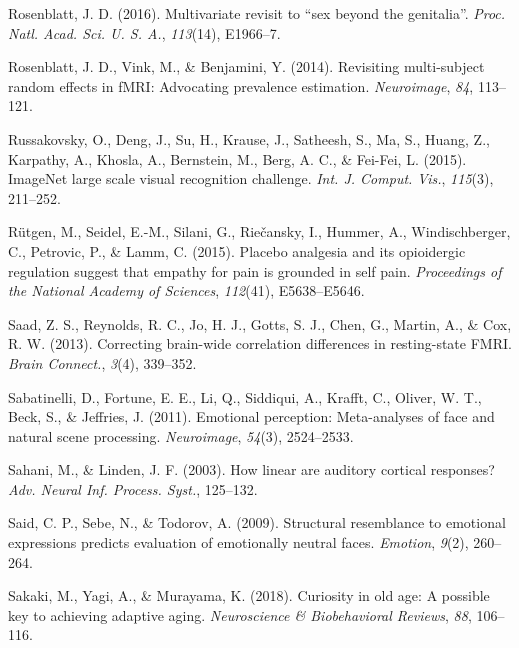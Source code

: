 \documentclass[11pt,american,]{memoir} %
\begin{document}
\leavevmode\hypertarget{ref-Rosenblatt2016-oy}{}%
Rosenblatt, J. D. (2016). Multivariate revisit to ``sex beyond the genitalia''. \emph{Proc. Natl. Acad. Sci. U. S. A.}, \emph{113}(14), E1966--7.

\leavevmode\hypertarget{ref-Rosenblatt2014-az}{}%
Rosenblatt, J. D., Vink, M., \& Benjamini, Y. (2014). Revisiting multi-subject random effects in fMRI: Advocating prevalence estimation. \emph{Neuroimage}, \emph{84}, 113--121.

\leavevmode\hypertarget{ref-Russakovsky2015-oo}{}%
Russakovsky, O., Deng, J., Su, H., Krause, J., Satheesh, S., Ma, S., Huang, Z., Karpathy, A., Khosla, A., Bernstein, M., Berg, A. C., \& Fei-Fei, L. (2015). ImageNet large scale visual recognition challenge. \emph{Int. J. Comput. Vis.}, \emph{115}(3), 211--252.

\leavevmode\hypertarget{ref-rutgen2015placebo}{}%
Rütgen, M., Seidel, E.-M., Silani, G., Riečansky, I., Hummer, A., Windischberger, C., Petrovic, P., \& Lamm, C. (2015). Placebo analgesia and its opioidergic regulation suggest that empathy for pain is grounded in self pain. \emph{Proceedings of the National Academy of Sciences}, \emph{112}(41), E5638--E5646.

\leavevmode\hypertarget{ref-Saad2013-zd}{}%
Saad, Z. S., Reynolds, R. C., Jo, H. J., Gotts, S. J., Chen, G., Martin, A., \& Cox, R. W. (2013). Correcting brain-wide correlation differences in resting-state FMRI. \emph{Brain Connect.}, \emph{3}(4), 339--352.

\leavevmode\hypertarget{ref-sabatinelli2011emotional}{}%
Sabatinelli, D., Fortune, E. E., Li, Q., Siddiqui, A., Krafft, C., Oliver, W. T., Beck, S., \& Jeffries, J. (2011). Emotional perception: Meta-analyses of face and natural scene processing. \emph{Neuroimage}, \emph{54}(3), 2524--2533.

\leavevmode\hypertarget{ref-Sahani2003-kk}{}%
Sahani, M., \& Linden, J. F. (2003). How linear are auditory cortical responses? \emph{Adv. Neural Inf. Process. Syst.}, 125--132.

\leavevmode\hypertarget{ref-Said2009-tf}{}%
Said, C. P., Sebe, N., \& Todorov, A. (2009). Structural resemblance to emotional expressions predicts evaluation of emotionally neutral faces. \emph{Emotion}, \emph{9}(2), 260--264.

\leavevmode\hypertarget{ref-sakaki2018curiosity}{}%
Sakaki, M., Yagi, A., \& Murayama, K. (2018). Curiosity in old age: A possible key to achieving adaptive aging. \emph{Neuroscience \& Biobehavioral Reviews}, \emph{88}, 106--116.
\end{document}
